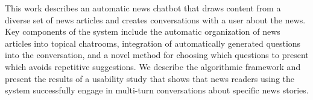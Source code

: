 This work describes an automatic news chatbot that draws content from a diverse set of news articles and creates conversations with a user about the news. Key components of the system include the automatic organization of news articles into topical chatrooms, integration of automatically generated questions into the conversation, and a novel method for choosing which questions to present which avoids repetitive suggestions. We describe the algorithmic framework and present the results of a usability study that shows that news readers using the system successfully engage in multi-turn conversations about specific news stories.
